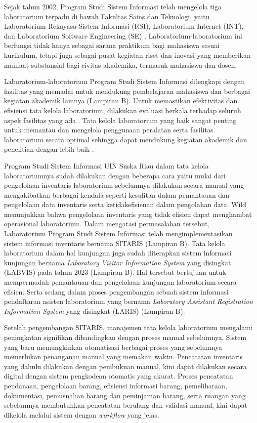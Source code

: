 Sejak tahun 2002, Program Studi Sistem Informasi telah mengelola tiga laboratorium terpadu di bawah Fakultas Sains dan Teknologi, yaitu Laboratorium Rekayasa Sistem Informasi (RSI), Laboratorium Internet (INT), dan Laboratorium Software Engineering (SE) \cite{labsi2023}. Laboratorium-laboratorium ini berfungsi tidak hanya sebagai sarana praktikum bagi mahasiswa sesuai kurikulum, tetapi juga sebagai pusat kegiatan riset dan inovasi yang memberikan manfaat substansial bagi civitas akademika, termasuk mahasiswa dan dosen.

Laboratorium-laboratorium Program Studi Sistem Informasi dilengkapi dengan fasilitas yang memadai untuk mendukung pembelajaran mahasiswa dan berbagai kegiatan akademik lainnya (Lampiran B). Untuk memastikan efektivitas dan efisiensi tata kelola laboratorium, dilakukan evaluasi berkala terhadap seluruh aspek fasilitas yang ada \cite{labsi2023}. Tata kelola laboratorium yang baik sangat penting untuk memantau dan mengelola penggunaan peralatan serta fasilitas laboratorium secara optimal sehingga dapat mendukung kegiatan akademik dan penelitian dengan lebih baik \cite{dongapure2024good}.

Program Studi Sistem Informasi UIN Suska Riau dalam tata kelola laboratoriumnya sudah dilakukan dengan beberapa cara yaitu mulai dari pengelolaan inventaris laboratorium sebelumnya dilakukan secara manual yang mengakibatkan berbagai kendala seperti kesulitan dalam pemantauan dan pengelolaan data inventaris serta ketidakefisienan dalam pengolahan data. Wild \citeyear{smith2021agile} menunjukkan bahwa pengelolaan inventaris yang tidak efisien dapat menghambat operasional laboratorium. Dalam mengatasi permasalahan tersebut, Laboratorium Program Studi Sistem Informasi telah mengimplementasikan sistem informasi inventaris bernama SITARIS (Lampiran B). Tata kelola laboratorium dalam hal kunjungan juga sudah diterapkan sistem informasi kunjungan bernama \textit{Laboratory Visitor Information System} yang disingkat (LABVIS) pada tahun 2023 (Lampiran B). Hal tersebut bertujuan untuk mempermudah pemantauan dan pengelolaan kunjungan laboratorium secara efisien. Serta sedang dalam proses pengembangan sebuah sistem informasi pendaftaran asisten laboratorium yang bernama \textit{Laboratory Assistant Registration Information System} yang disingkat (LARIS) (Lampiran B).

Setelah pengembangan SITARIS, manajemen tata kelola laboratorium mengalami peningkatan signifikan dibandingkan dengan proses manual sebelumnya. Sistem yang baru memungkinkan otomatisasi berbagai proses yang sebelumnya memerlukan penanganan manual yang memakan waktu. Pencatatan inventaris yang dahulu dilakukan dengan pembukuan manual, kini dapat dilakukan secara digital dengan sistem pengkodean otomatis yang akurat. Proses pencatatan pendanaan, pengelolaan barang, efisiensi informasi barang, pemeliharaan, dokumentasi, pemusnahan barang dan peminjaman barang, serta ruangan yang sebelumnya membutuhkan pencatatan berulang dan validasi manual, kini dapat dikelola melalui sistem dengan \textit{workflow} yang jelas.

